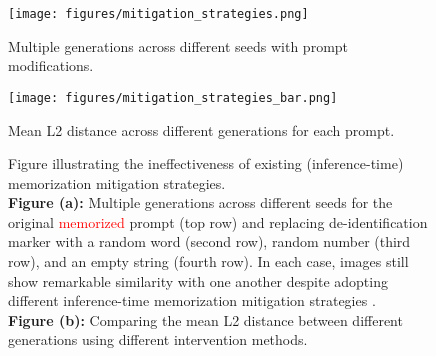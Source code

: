 \begin{figure}[ht]
    \centering
    \begin{minipage}{\textwidth}
        \centering
        \texttt{[image: figures/mitigation\_strategies.png]}
        \caption{Multiple generations across different seeds with prompt modifications.}
        \label{fig:first}
    \end{minipage}
    \hfill
    \begin{minipage}{\textwidth}
        \centering
        \texttt{[image: figures/mitigation\_strategies\_bar.png]}
        \caption{Mean L2 distance across different generations for each prompt.}
        \label{fig:second}
    \end{minipage}
    \caption{Figure illustrating the ineffectiveness of existing (inference-time) memorization mitigation strategies. \\
    \textbf{Figure (a):} Multiple generations across different seeds for the original \textcolor{red}{memorized} prompt (top row) and replacing de-identification marker with a random word (second row), random number (third row), and an empty string (fourth row). In each case, images still show remarkable similarity with one another despite adopting different inference-time memorization mitigation strategies \cite{somepalli2023understanding}. \\
    \textbf{Figure (b):} Comparing the mean L2 distance between different generations using different intervention methods. }
    \label{fig:mitigation_strategies_with_bar_plots}
    
\end{figure}